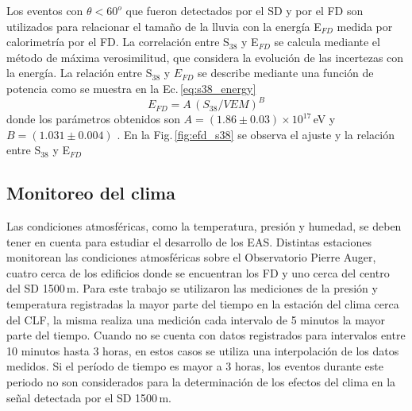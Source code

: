 Los eventos con $\theta<60^o$  que fueron detectados por el SD y por el FD son utilizados para relacionar el tamaño de la lluvia con la energía  E$_{FD}$ medida por calorimetría por el FD.  La correlación entre S$_{38}$ y E$_{FD}$ se calcula mediante el método de máxima verosimilitud, que considera la evolución de las incertezas con la energía. La relación entre S$_{38}$ y $E_{FD}$ se describe mediante una función de potencia como se muestra en la Ec.\,\ref{eq:s38_energy}
\begin{equation}
	E_{FD}= A\, (S_{38}/VEM)^B
	\label{eq:s38_energy}
\end{equation}
donde los parámetros obtenidos son $A=(1.86\pm0.03)\times 10^{17}\,$eV y $B=(1.031\pm0.004)$  \cite{tobepublished}. En la Fig.\,\ref{fig:efd_s38} se observa el ajuste y la relación entre  S$_{38}$ y E$_{FD}$






\subsection{Monitoreo del clima}\label{seccion:clima}

Las condiciones atmosféricas, como la temperatura, presión y humedad, se deben tener en cuenta para estudiar el desarrollo de los EAS. Distintas estaciones monitorean las condiciones atmosféricas sobre el Observatorio Pierre Auger, cuatro cerca  de los edificios donde se encuentran los FD y uno cerca del centro del SD 1500\,m. Para este trabajo se utilizaron las mediciones de la presión y temperatura registradas la mayor parte del tiempo en la estación del clima cerca del CLF, la misma realiza una medición cada intervalo de 5 minutos la mayor parte del tiempo. Cuando no se cuenta con datos registrados para intervalos entre 10 minutos hasta 3 horas, en estos casos se utiliza una interpolación de los datos medidos. Si el período de tiempo es mayor a 3 horas, los eventos durante este periodo no son considerados para la determinación de los efectos del clima en la señal detectada por el SD 1500\,m.